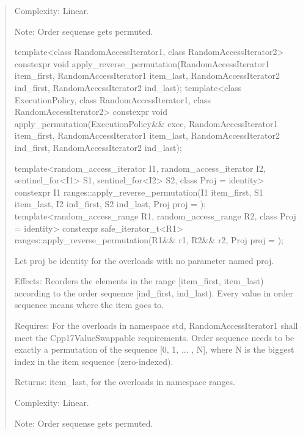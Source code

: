 \documentclass{wg21}
\begin{document}
\begin{quote}
    Complexity: Linear.
    
    Note: Order sequense gets permuted.

\begin{itemdecl}
template<class RandomAccessIterator1, class RandomAccessIterator2>
  constexpr void apply_reverse_permutation(RandomAccessIterator1 item_first,
                                           RandomAccessIterator1 item_last,
                                           RandomAccessIterator2 ind_first,
                                           RandomAccessIterator2 ind_last);
template<class ExecutionPolicy, class RandomAccessIterator1, class RandomAccessIterator2>
  constexpr void apply_permutation(ExecutionPolicy&& exec,
                                   RandomAccessIterator1 item_first,
                                   RandomAccessIterator1 item_last,
                                   RandomAccessIterator2 ind_first,
                                   RandomAccessIterator2 ind_last);
                                               
template<random_access_iterator I1, random_access_iterator I2,
         sentinel_for<I1> S1, sentinel_for<I2> S2, class Proj = identity>
  constexpr I1 ranges::apply_reverse_permutation(I1 item_first, S1 item_last,
                                                 I2 ind_first, S2 ind_last, Proj proj = {});                                           	
template<random_access_range R1, random_access_range R2, class Proj = identity>
  constexpr safe_iterator_t<R1> ranges::apply_reverse_permutation(R1&& r1, R2&& r2,
                                                                  Proj proj = {});  
\end{itemdecl}

    Let proj be identity{} for the overloads with no parameter named proj.
    
    Effects: Reorders the elements in the range [item_first, item_last) according to the order sequence [ind_first, ind_last). Every value in order sequence means where the item goes to.
    
    Requires: For the overloads in namespace std, RandomAccessIterator1 shall meet the Cpp17ValueSwappable requirements. Order sequence needs to be exactly a permutation of the sequence [0, 1, ... , N], where N is the biggest index in the item sequence (zero-indexed).
    
    Returns: item_last, for the overloads in namespace ranges.
    
    Complexity: Linear.
    
    Note: Order sequense gets permuted.
\end{quote}
\end{document}

